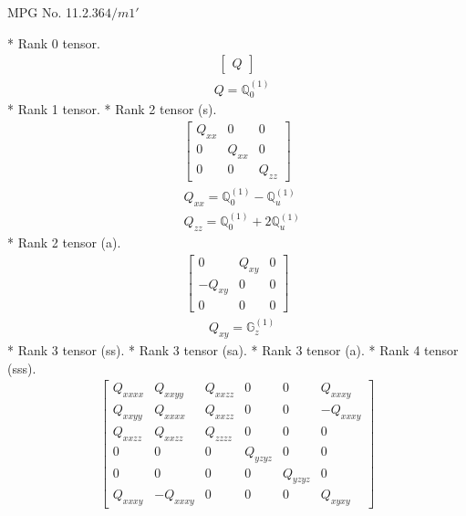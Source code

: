 \documentclass[fleqn,8pt,landscape]{jsarticle}
\begin{document}
\setcounter{MaxMatrixCols}{32}

\renewcommand{\tablename}{Table~}
\renewcommand{\figurename}{Figure~}
\begin{center}
\LARGE
MPG No. 11.2.36\quad$4/m1'$
\end{center}
* Rank 0 tensor.
\begin{align*}
\begin{bmatrix} Q \end{bmatrix}
\end{align*}
\begin{align*}
& Q = \mathbb{Q}_{0}^{(1)}
\end{align*}
* Rank 1 tensor.
* Rank 2 tensor (s).
\begin{align*}
\begin{bmatrix} Q_{xx} & 0 & 0 \\ 0 & Q_{xx} & 0 \\ 0 & 0 & Q_{zz} \end{bmatrix}
\end{align*}
\begin{align*}
& Q_{xx} = \mathbb{Q}_{0}^{(1)} - \mathbb{Q}_{u}^{(1)} \\
& Q_{zz} = \mathbb{Q}_{0}^{(1)} + 2 \mathbb{Q}_{u}^{(1)}
\end{align*}
* Rank 2 tensor (a).
\begin{align*}
\begin{bmatrix} 0 & Q_{xy} & 0 \\ - Q_{xy} & 0 & 0 \\ 0 & 0 & 0 \end{bmatrix}
\end{align*}
\begin{align*}
& Q_{xy} = \mathbb{G}_{z}^{(1)}
\end{align*}
* Rank 3 tensor (ss).
* Rank 3 tensor (sa).
* Rank 3 tensor (a).
* Rank 4 tensor (sss).
\begin{align*}
\begin{bmatrix} Q_{xxxx} & Q_{xxyy} & Q_{xxzz} & 0 & 0 & Q_{xxxy} \\ Q_{xxyy} & Q_{xxxx} & Q_{xxzz} & 0 & 0 & - Q_{xxxy} \\ Q_{xxzz} & Q_{xxzz} & Q_{zzzz} & 0 & 0 & 0 \\ 0 & 0 & 0 & Q_{yzyz} & 0 & 0 \\ 0 & 0 & 0 & 0 & Q_{yzyz} & 0 \\ Q_{xxxy} & - Q_{xxxy} & 0 & 0 & 0 & Q_{xyxy} \end{bmatrix}
\end{align*}
\end{document}
